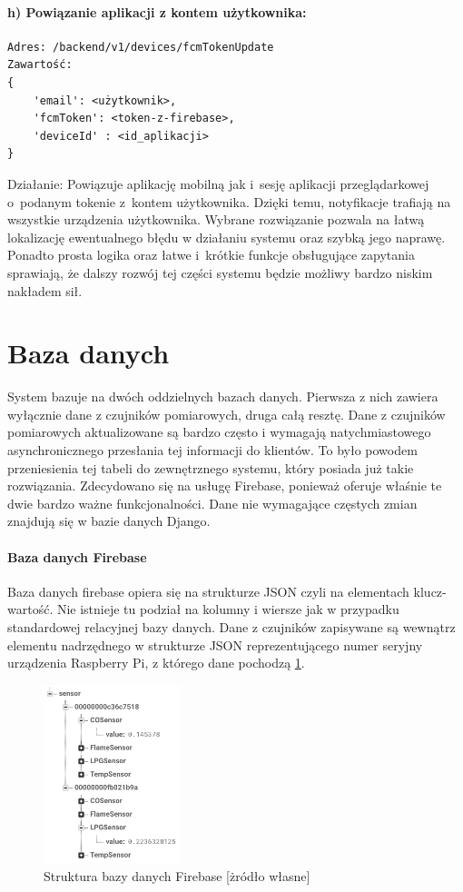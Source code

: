 \paragraph{h) Powiązanie aplikacji z kontem użytkownika:}
\begin{verbatim}
Adres: /backend/v1/devices/fcmTokenUpdate
Zawartość: 
{
	'email': <użytkownik>, 
	'fcmToken': <token-z-firebase>, 
	'deviceId' : <id_aplikacji>
}
\end{verbatim}
Działanie: Powiązuje aplikację mobilną jak i~sesję aplikacji przeglądarkowej o~podanym tokenie z~kontem użytkownika. Dzięki temu, notyfikacje trafiają na wszystkie urządzenia użytkownika.
\newline
\newline
Wybrane rozwiązanie pozwala na łatwą lokalizację ewentualnego błędu w działaniu systemu oraz szybką jego naprawę. Ponadto prosta logika oraz łatwe i~krótkie funkcje obsługujące zapytania sprawiają, że dalszy rozwój tej części systemu będzie możliwy bardzo niskim nakładem sił. 

\section{Baza danych}
System bazuje na dwóch oddzielnych bazach danych. Pierwsza z nich zawiera wyłącznie dane z czujników pomiarowych, druga całą resztę. Dane z czujników pomiarowych aktualizowane są bardzo często i wymagają natychmiastowego asynchronicznego przesłania tej informacji do klientów. To było powodem przeniesienia tej tabeli do zewnętrznego systemu, który posiada już takie rozwiązania. Zdecydowano się na usługę Firebase, ponieważ oferuje właśnie te dwie bardzo ważne funkcjonalności.  Dane nie wymagające częstych zmian znajdują się w bazie danych Django.

\paragraph{Baza danych Firebase}
Baza danych firebase opiera się na strukturze JSON czyli na elementach klucz-wartość. Nie istnieje tu podział na kolumny i wiersze jak w przypadku standardowej relacyjnej bazy danych. Dane z czujników zapisywane są wewnątrz elementu nadrzędnego w strukturze JSON reprezentującego numer seryjny urządzenia Raspberry Pi, z którego dane pochodzą \ref{json}. 
\begin{figure}[ht]
   \centering
   \includegraphics[width=4cm]{firebasejson.png} 
   \caption{Struktura bazy danych Firebase [żródło własne]}
   \label{json}
\end{figure}

